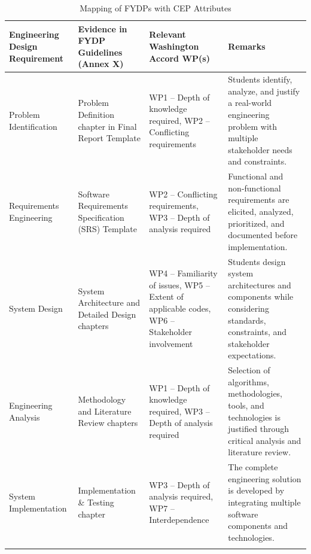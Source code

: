 \begin{table}[H]
\centering
\scriptsize %
\renewcommand{\arraystretch}{0.70} %
\caption{Mapping of FYDPs with CEP Attributes}
\label{tab:fydp_cep_mapping}
\begin{tabular}{>{\raggedright\arraybackslash}p{}
                >{\raggedright\arraybackslash}p{}
                >{\raggedright\arraybackslash}p{}
                >{\raggedright\arraybackslash}p{}}
\toprule
\textbf{Engineering Design Requirement} & 
\textbf{Evidence in FYDP Guidelines (Annex X)} & 
\textbf{Relevant Washington Accord WP(s)} & 
\textbf{Remarks} \\
\midrule

Problem Identification & 
Problem Definition chapter in Final Report Template & 
WP1 -- Depth of knowledge required, WP2 -- Conflicting requirements & 
Students identify, analyze, and justify a real-world engineering problem with multiple stakeholder needs and constraints. \\ \addlinespace[2pt]

Requirements Engineering & 
Software Requirements Specification (SRS) Template & 
WP2 -- Conflicting requirements, WP3 -- Depth of analysis required & 
Functional and non-functional requirements are elicited, analyzed, prioritized, and documented before implementation. \\ \addlinespace[2pt]

System Design & 
System Architecture and Detailed Design chapters & 
WP4 -- Familiarity of issues, WP5 -- Extent of applicable codes, WP6 -- Stakeholder involvement & 
Students design system architectures and components while considering standards, constraints, and stakeholder expectations. \\ \addlinespace[2pt]

Engineering Analysis & 
Methodology and Literature Review chapters & 
WP1 -- Depth of knowledge required, WP3 -- Depth of analysis required & 
Selection of algorithms, methodologies, tools, and technologies is justified through critical analysis and literature review. \\ \addlinespace[2pt]

System Implementation & 
Implementation \& Testing chapter & 
WP3 -- Depth of analysis required, WP7 -- Interdependence & 
The complete engineering solution is developed by integrating multiple software components and technologies. \\ \addlinespace[2pt]


\end{tabular}
\end{table}
